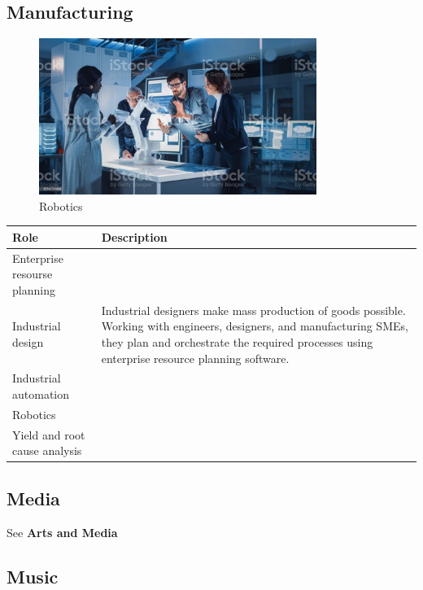 \subsection{Manufacturing}

\begin{figure}[H]
	\begin{center}
		\caption{Robotics}
		\vskip 4pt
		\includegraphics[height=2in]{images/careers/istockphoto-1214111404-1024x1024.jpg}
	\end{center}
\end{figure}

\begin{table}[H]
	\begin{center}
		\begin{tabular}{p{1in}|p{3.4in}} 
			\textbf{Role} & \textbf{Description}\\
			\hline
			Enterprise resourse planning & \\
			\hline
			Industrial design & Industrial designers make mass production of goods possible. Working with engineers, designers, and manufacturing SMEs, they plan and orchestrate the required processes using enterprise resource planning software.\\
			\hline
			Industrial automation & \\
			\hline
			Robotics & \\
			\hline
			Yield and root cause analysis & \\
			\hline
		\end{tabular}
	\end{center}
\end{table}

\subsection{Media}
See \textbf{Arts and Media}

\subsection{Music}


